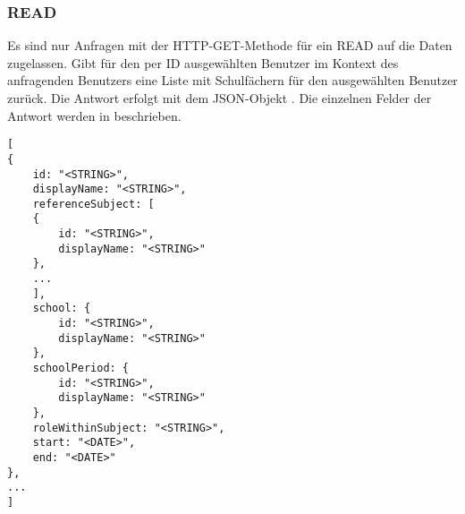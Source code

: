 \subsubsection{READ}
\label{sec:rest:api:users:id:subjects:read}
Es sind nur Anfragen mit der HTTP-GET-Methode für ein READ auf die Daten zugelassen.
Gibt für den per ID ausgewählten Benutzer im Kontext des anfragenden Benutzers eine Liste mit Schulfächern für den ausgewählten Benutzer zurück.
Die Antwort erfolgt mit dem JSON-Objekt . 
Die einzelnen Felder der Antwort werden in  beschrieben.

\begin{lstlisting}[caption={JSON-Antwort für einen GET-Aufruf des Pfads /api/users/\$id/subjects},label={lst:code:rest:api:users:id:subjects:read:ret},frame=tlrb]
[
{
	id: "<STRING>",
	displayName: "<STRING>",
	referenceSubject: [
	{
		id: "<STRING>",
		displayName: "<STRING>"
	},
	...
	],
	school: {
		id: "<STRING>",
		displayName: "<STRING>"
	},
	schoolPeriod: {
		id: "<STRING>",
		displayName: "<STRING>"
	},
	roleWithinSubject: "<STRING>",
	start: "<DATE>",
	end: "<DATE>" 		
},
...
]
\end{lstlisting}

